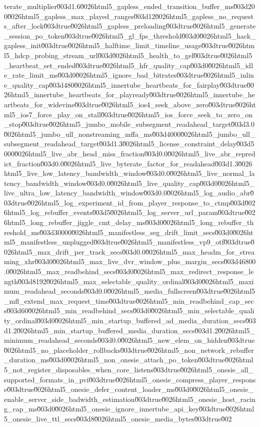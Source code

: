 {terate_multiplier\u003d1.6\u0026html5_gapless_ended_transition_buffer_ms\u003d200\u0026html5_gapless_max_played_ranges\u003d12\u0026html5_gapless_no_requests_after_lock\u003dtrue\u0026html5_gapless_preloading\u003dtrue\u0026html5_generate_session_po_token\u003dtrue\u0026html5_gl_fps_threshold\u003d0\u0026html5_hack_gapless_init\u003dtrue\u0026html5_halftime_limit_timeline_usage\u003dtrue\u0026html5_hdcp_probing_stream_url\u003d\u0026html5_health_to_gel\u003dtrue\u0026html5_heartbeat_set_ended\u003dtrue\u0026html5_hfr_quality_cap\u003d0\u0026html5_idle_rate_limit_ms\u003d0\u0026html5_ignore_bad_bitrates\u003dtrue\u0026html5_inline_quality_cap\u003d480\u0026html5_innertube_heartbeats_for_fairplay\u003dtrue\u0026html5_innertube_heartbeats_for_playready\u003dtrue\u0026html5_innertube_heartbeats_for_widevine\u003dtrue\u0026html5_ios4_seek_above_zero\u003dtrue\u0026html5_ios7_force_play_on_stall\u003dtrue\u0026html5_ios_force_seek_to_zero_on_stop\u003dtrue\u0026html5_jumbo_mobile_subsegment_readahead_target\u003d3.0\u0026html5_jumbo_ull_nonstreaming_mffa_ms\u003d4000\u0026html5_jumbo_ull_subsegment_readahead_target\u003d1.3\u0026html5_license_constraint_delay\u003d5000\u0026html5_live_abr_head_miss_fraction\u003d0.0\u0026html5_live_abr_repredict_fraction\u003d0.0\u0026html5_live_byterate_factor_for_readahead\u003d1.3\u0026html5_live_low_latency_bandwidth_window\u003d0.0\u0026html5_live_normal_latency_bandwidth_window\u003d0.0\u0026html5_live_quality_cap\u003d0\u0026html5_live_ultra_low_latency_bandwidth_window\u003d0.0\u0026html5_log_audio_abr\u003dtrue\u0026html5_log_experiment_id_from_player_response_to_ctmp\u003d\u0026html5_log_rebuffer_events\u003d5\u0026html5_log_server_url_param\u003dtrue\u0026html5_long_rebuffer_jiggle_cmt_delay_ms\u003d0\u0026html5_long_rebuffer_threshold_ms\u003d30000\u0026html5_manifestless_seg_drift_limit_secs\u003d0\u0026html5_manifestless_unplugged\u003dtrue\u0026html5_manifestless_vp9_otf\u003dtrue\u0026html5_max_drift_per_track_secs\u003d0.0\u0026html5_max_headm_for_streaming_xhr\u003d0\u0026html5_max_live_dvr_window_plus_margin_secs\u003d46800.0\u0026html5_max_readbehind_secs\u003d0\u0026html5_max_redirect_response_length\u003d8192\u0026html5_max_selectable_quality_ordinal\u003d0\u0026html5_maximum_readahead_seconds\u003d0.0\u0026html5_media_fullscreen\u003dtrue\u0026html5_mfl_extend_max_request_time\u003dtrue\u0026html5_min_readbehind_cap_secs\u003d60\u0026html5_min_readbehind_secs\u003d0\u0026html5_min_selectable_quality_ordinal\u003d0\u0026html5_min_startup_buffered_ad_media_duration_secs\u003d1.2\u0026html5_min_startup_buffered_media_duration_secs\u003d1.2\u0026html5_minimum_readahead_seconds\u003d0.0\u0026html5_new_elem_on_hidden\u003dtrue\u0026html5_no_placeholder_rollbacks\u003dtrue\u0026html5_non_network_rebuffer_duration_ms\u003d0\u0026html5_non_onesie_attach_po_token\u003dtrue\u0026html5_not_register_disposables_when_core_listens\u003dtrue\u0026html5_onesie_all_supported_formats_in_pvi\u003dtrue\u0026html5_onesie_compress_player_response\u003dtrue\u0026html5_onesie_defer_content_loader_ms\u003d0\u0026html5_onesie_enable_server_side_badwidth_estimation\u003dtrue\u0026html5_onesie_host_racing_cap_ms\u003d0\u0026html5_onesie_ignore_innertube_api_key\u003dtrue\u0026html5_onesie_live_ttl_secs\u003d8\u0026html5_onesie_media_bytes\u003dtrue\u002}

